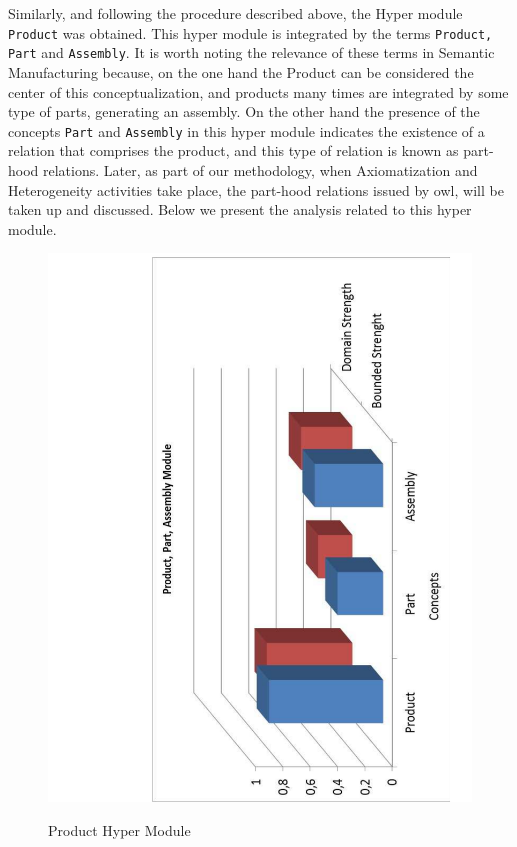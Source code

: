 Similarly, and following the procedure described above, the Hyper module \texttt{Product} was obtained. This hyper module is integrated   by the terms \texttt{Product, Part} and \texttt{Assembly}. It is worth noting the relevance of these terms in Semantic Manufacturing because,   on the one hand the Product can be considered the center of this conceptualization, and products many times are integrated by some type of parts, generating an assembly. On the other hand the presence of the concepts \texttt{Part} and \texttt{Assembly} in this hyper module indicates the existence of a relation that comprises the product, and this type of relation is known as part-hood relations. Later, as part of our methodology, when Axiomatization and Heterogeneity activities take place, the part-hood relations issued by \gls{owl}, will be taken up and discussed. Below we present the analysis related to this hyper module. 


\begin{figure}
\begin{center}
	\includegraphics[scale=0.5, angle=-90]{figure-chapterIV/fig4-18.pdf}\\
	\caption{Product Hyper Module}
	\label{figure4-18}
\end{center}
\end{figure}

